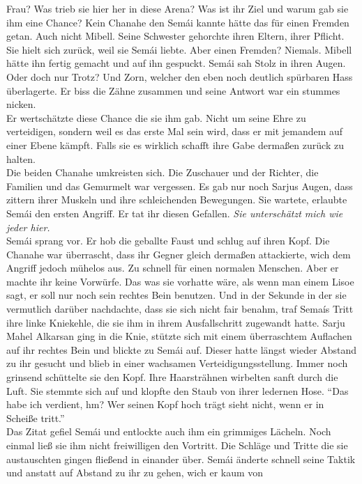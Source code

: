 Frau? Was trieb sie hier her in diese Arena? Was ist ihr Ziel und warum gab sie ihm eine Chance? 
Kein Chanahe den Semái kannte hätte das für einen Fremden getan. Auch nicht Mibell. Seine Schwester 
gehorchte ihren Eltern, ihrer Pflicht. Sie hielt sich zurück, weil sie Semái liebte. Aber einen 
Fremden? Niemals. Mibell hätte ihn fertig gemacht und auf ihn gespuckt. Semái sah Stolz in ihren 
Augen. Oder doch nur Trotz? Und Zorn, welcher den eben noch deutlich spürbaren Hass überlagerte. Er 
biss die Zähne zusammen und seine Antwort war ein stummes nicken. \\
Er wertschätzte diese Chance die sie ihm gab. Nicht um seine Ehre zu verteidigen, sondern weil es 
das erste Mal sein wird, dass er mit jemandem auf einer Ebene kämpft. Falls sie es wirklich schafft 
ihre Gabe dermaßen zurück zu halten.\\
Die beiden Chanahe umkreisten sich. Die Zuschauer und der Richter, die Familien und das Gemurmelt 
war vergessen. Es gab nur noch Sarjus Augen, dass zittern ihrer Muskeln und ihre 
schleichenden Bewegungen. Sie wartete, erlaubte Semái den ersten Angriff. Er tat ihr diesen 
Gefallen. \textit{Sie unterschätzt mich wie jeder hier.}\\
Semái sprang vor. Er hob die geballte Faust und schlug auf ihren Kopf. Die Chanahe war überrascht, 
dass ihr Gegner gleich dermaßen attackierte, wich dem Angriff jedoch mühelos aus. Zu schnell 
für einen normalen Menschen. Aber er machte ihr keine Vorwürfe. Das was sie vorhatte wäre, als wenn 
man einem Lisoe sagt, er soll nur noch sein rechtes Bein benutzen. Und in der Sekunde in der sie 
vermutlich darüber nachdachte, dass sie sich nicht fair benahm, traf Semaís Tritt ihre linke 
Kniekehle, die sie ihm in ihrem Ausfallschritt zugewandt hatte. Sarju Mahel Alkarsan ging in die 
Knie, stützte sich mit einem überraschtem Auflachen auf ihr rechtes Bein und blickte zu Semái auf. 
Dieser hatte längst wieder Abstand zu ihr gesucht und blieb in einer wachsamen 
Verteidigungsstellung. Immer noch grinsend schüttelte sie den Kopf. Ihre Haarsträhnen wirbelten 
sanft durch die Luft. Sie stemmte sich auf und klopfte den Staub von ihrer ledernen Hose. ``Das 
habe ich verdient, hm? Wer seinen Kopf hoch trägt sieht nicht, wenn er in Scheiße tritt.''\\
Das Zitat gefiel Semái und entlockte auch ihm ein grimmiges Lächeln. Noch einmal ließ sie ihm nicht 
freiwilligen den Vortritt. Die Schläge und Tritte die sie austauschten gingen fließend in einander 
über. Semái änderte schnell seine Taktik und anstatt auf Abstand zu ihr zu gehen, wich er kaum von 
